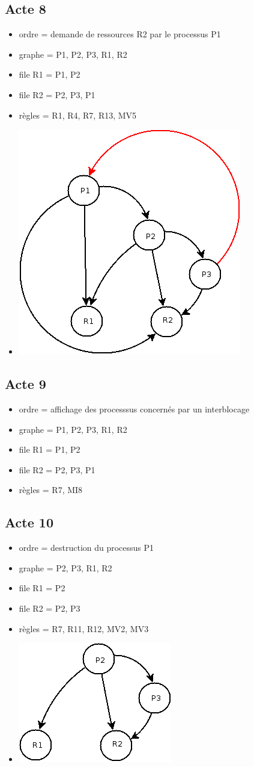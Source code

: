 \documentclass{article}
\newcommand{\bitem}{\item[\textbullet]}
\begin{document}
\subsection{Acte 8}
\begin{itemize}
  \bitem ordre = demande de ressources R2 par le processus P1
  \bitem graphe = P1, P2, P3, R1, R2
  \bitem file R1 = P1, P2
  \bitem file R2 = P2, P3, P1
  \bitem règles = R1, R4, R7, R13, MV5
  \bitem \includegraphics[scale=0.5]{images/acte8}
\end{itemize}
\subsection{Acte 9}
\begin{itemize}
  \bitem ordre = affichage des processsus concernés par un interblocage
  \bitem graphe = P1, P2, P3, R1, R2
  \bitem file R1 = P1, P2
  \bitem file R2 = P2, P3, P1
  \bitem règles = R7, MI8
\end{itemize}
\subsection{Acte 10}
\begin{itemize}
  \bitem ordre = destruction du processus P1
  \bitem graphe = P2, P3, R1, R2
  \bitem file R1 = P2
  \bitem file R2 = P2, P3
  \bitem règles = R7, R11, R12, MV2, MV3
  \bitem \includegraphics[scale=0.5]{images/acte10}
\end{itemize}
\end{document}
